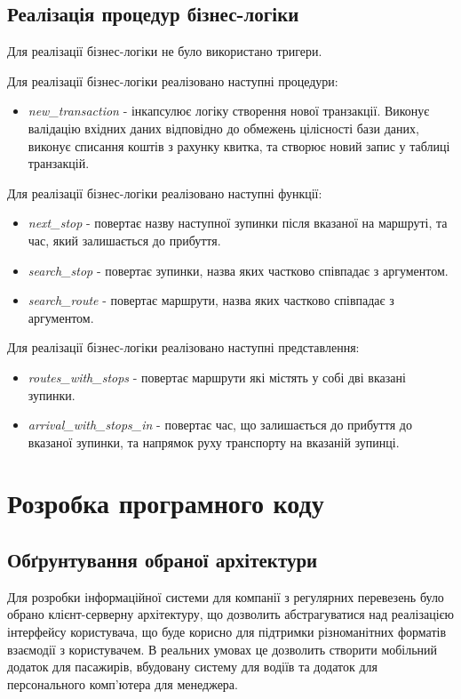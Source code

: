 \documentclass[oneside,14pt]{extarticle}
\begin{document}
\subsection{Реалізація процедур бізнес-логіки}
Для реалізації бізнес-логіки не було використано тригери.

Для реалізації бізнес-логіки реалізовано наступні процедури:
\begin{itemize}
\item \textit{new\_transaction} - інкапсулює логіку створення нової транзакції. Виконує валідацію вхідних даних відповідно до обмежень цілісності бази даних, виконує списання коштів з рахунку квитка, та створює новий запис у таблиці транзакцій.
\end{itemize}

Для реалізації бізнес-логіки реалізовано наступні функції:
\begin{itemize}
\item \textit{next\_stop} - повертає назву наступної зупинки після вказаної на маршруті, та час, який залишається до прибуття.
\item \textit{search\_stop} - повертає зупинки, назва яких частково співпадає з аргументом.
\item \textit{search\_route} - повертає маршрути, назва яких частково співпадає з аргументом.
\end{itemize}

Для реалізації бізнес-логіки реалізовано наступні представлення:
\begin{itemize}
\item \textit{routes\_with\_stops} - повертає маршрути які містять у собі дві вказані зупинки.
\item \textit{arrival\_with\_stops\_in} - повертає час, що залишається до прибуття до вказаної зупинки, та напрямок руху транспорту на вказаній зупинці.
\end{itemize}

\newpage

\section{Розробка програмного коду}
\subsection{Обґрунтування обраної архітектури}
Для розробки інформаційної системи для компанії з регулярних перевезень було обрано клієнт-серверну архітектуру, що дозволить абстрагуватися над реалізацією інтерфейсу користувача, що буде корисно для підтримки різноманітних форматів взаємодії з користувачем. В реальних умовах це дозволить створити мобільний додаток для пасажирів, вбудовану систему для водіїв та додаток для персонального комп'ютера для менеджера.
\end{document}
